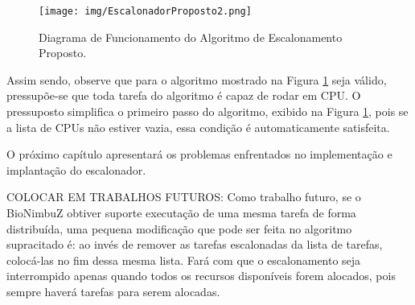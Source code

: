 \begin{figure}[htbp]
	\centerline{\texttt{[image: img/EscalonadorProposto2.png]}}
	\caption{Diagrama de Funcionamento do Algoritmo de Escalonamento Proposto.}
	\label{Escalonamento}
\end{figure}


Assim sendo, observe que para o algoritmo mostrado na Figura \ref{Escalonamento} seja válido, pressupõe-se que toda tarefa do algoritmo é capaz de rodar em \acrshort{CPU}. O pressuposto simplifica o primeiro passo do algoritmo, exibido na Figura \ref{Escalonamento}, pois se a lista de \acrshort{CPU}s não estiver vazia, essa condição é automaticamente satisfeita.

O próximo capítulo apresentará os problemas enfrentados no implementação e implantação do escalonador.

COLOCAR EM TRABALHOS FUTUROS: Como trabalho futuro, se o BioNimbuZ obtiver suporte executação de uma mesma tarefa de forma distribuída, uma pequena modificação que pode ser feita no algoritmo supracitado é: ao invés de remover as tarefas escalonadas da lista de tarefas, colocá-las no fim dessa mesma lista. Fará com que o escalonamento seja interrompido apenas quando todos os recursos disponíveis forem alocados, pois sempre haverá tarefas para serem alocadas.


